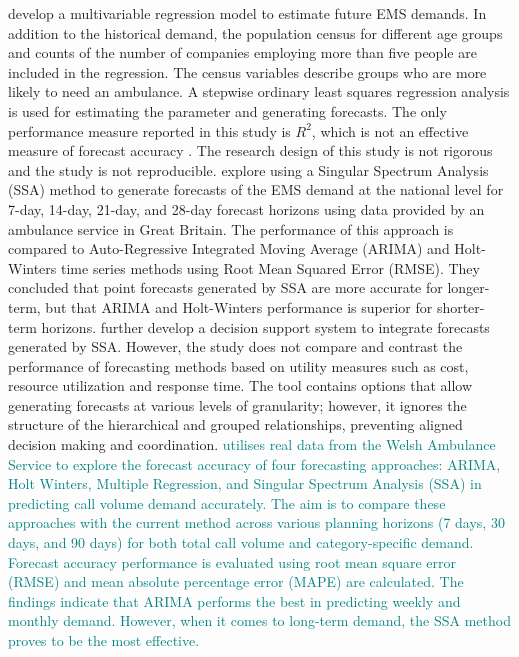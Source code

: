 \documentclass[
  authoryear,
  preprint,
  3p]{elsarticle}
\begin{document}
\citet{sasaki2010using} develop a multivariable regression model to
estimate future EMS demands. In addition to the historical demand, the
population census for different age groups and counts of the number of
companies employing more than five people are included in the
regression. The census variables describe groups who are more likely to
need an ambulance. A stepwise ordinary least squares regression analysis
is used for estimating the parameter and generating forecasts. The only
performance measure reported in this study is \(R^2\), which is not an
effective measure of forecast accuracy \citep[p457]{armstrong01}. The
research design of this study is not rigorous and the study is not
reproducible. \citet{vile2012predicting} explore using a Singular
Spectrum Analysis (SSA) method to generate forecasts of the EMS demand
at the national level for 7-day, 14-day, 21-day, and 28-day forecast
horizons using data provided by an ambulance service in Great Britain.
The performance of this approach is compared to Auto-Regressive
Integrated Moving Average (ARIMA) and Holt-Winters time series methods
using Root Mean Squared Error (RMSE). They concluded that point
forecasts generated by SSA are more accurate for longer-term, but that
ARIMA and Holt-Winters performance is superior for shorter-term
horizons. \citet{vile2016time} further develop a decision support system
to integrate forecasts generated by SSA. However, the study does not
compare and contrast the performance of forecasting methods based on
utility measures such as cost, resource utilization and response time.
The tool contains options that allow generating forecasts at various
levels of granularity; however, it ignores the structure of the
hierarchical and grouped relationships, preventing aligned decision
making and coordination. \citet{al2021empirical}
\textcolor{teal}{utilises real data from the Welsh Ambulance Service to explore the forecast accuracy of four forecasting approaches: ARIMA, Holt Winters, Multiple Regression, and Singular Spectrum Analysis (SSA) in predicting call volume demand accurately. The aim is to compare these approaches with the current method across various planning horizons (7 days, 30 days, and 90 days) for both total call volume and category-specific demand. Forecast accuracy performance is evaluated using root mean square error (RMSE) and mean absolute percentage error (MAPE) are calculated. The findings indicate that ARIMA performs the best in predicting weekly and monthly demand. However, when it comes to long-term demand, the SSA method proves to be the most effective.}
\end{document}

